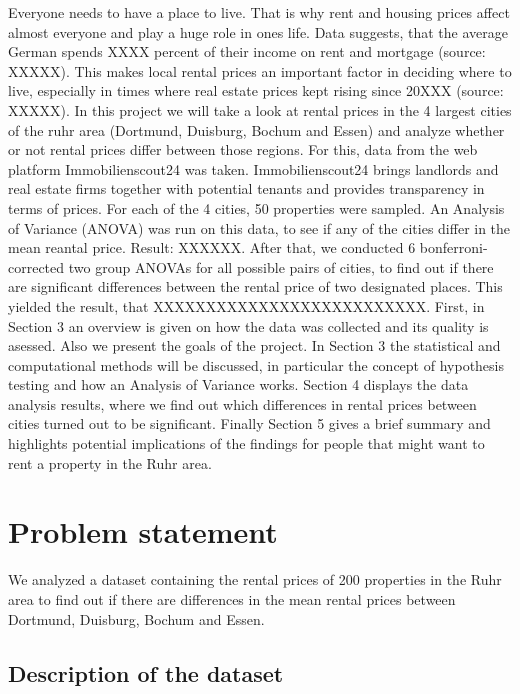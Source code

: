 \documentclass[12 pt]{scrartcl}
\begin{document}
Everyone needs to have a place to live. That is why rent and housing prices affect almost everyone and play a huge role in ones life. Data suggests, that the average German spends XXXX percent of their income on rent and mortgage (source: XXXXX). This makes local rental prices an important factor in deciding where to live, especially in times where real estate prices kept rising since 20XXX (source: XXXXX).
In this project we will take a look at rental prices in the 4 largest cities of the ruhr area (Dortmund, Duisburg, Bochum and Essen) and analyze whether or not rental prices differ between those regions. For this, data from the web platform Immobilienscout24 was taken. Immobilienscout24 brings landlords and real estate firms together with potential tenants and provides transparency in terms of prices. For each of the 4 cities, 50 properties were sampled. An Analysis of Variance (ANOVA) was run on this data, to see if any of the cities differ in the mean reantal price. Result: XXXXXX.
After that, we conducted 6 bonferroni-corrected two group ANOVAs for all possible pairs of cities, to find out if there are significant differences between the rental price of two designated places. This yielded the result, that XXXXXXXXXXXXXXXXXXXXXXXXXX.
First, in Section 3 an overview is given on how the data was collected and its quality is asessed. Also we present the goals of the project. In Section 3 the statistical and computational methods will be discussed, in particular the concept of hypothesis testing and how an Analysis of Variance works.
Section 4 displays the data analysis results, where we find out which differences in rental prices between cities turned out to be significant. Finally Section 5 gives a brief summary and highlights potential implications of the findings for people that might want to rent a property in the Ruhr area.

\section{Problem statement}

We analyzed a dataset containing the rental prices of 200 properties in the Ruhr area to find out if there are differences in the mean rental prices between Dortmund, Duisburg, Bochum and Essen.

\subsection{Description of the dataset}
\end{document}
